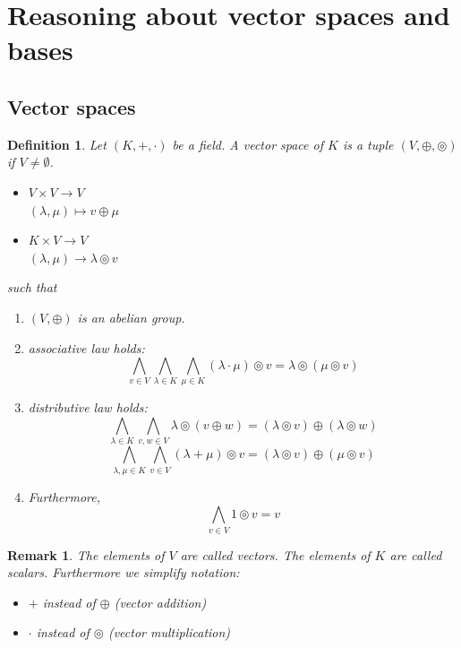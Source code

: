 \documentclass[a4paper,landscape,twocolumn]{article}
\newtheorem{defi}{Definition}[section]
\newtheorem{rem}{Remark}[section]
\begin{document}
\section{Reasoning about vector spaces and bases}
\subsection{Vector spaces}

\begin{defi}
  Let $(K, +, \cdot)$ be a field.
  A vector space of $K$ is a tuple $(V, \oplus, \circledcirc)$
  if $V \neq \emptyset$.
  \begin{itemize}
    \item
      $V \times V \rightarrow V$ \\
      $(\lambda, \mu) \mapsto v \oplus \mu$
    \item
      $K \times V \rightarrow V$ \\
      $(\lambda, \mu) \rightarrow \lambda \circledcirc v$
  \end{itemize}
  such that
  \begin{enumerate}
    \item $(V, \oplus)$ is an abelian group.
    \item associative law holds:
      \[
        \bigwedge_{v \in V} \bigwedge_{\lambda \in K} \bigwedge_{\mu \in K} (\lambda \cdot \mu) \circledcirc v
        = \lambda \circledcirc (\mu \circledcirc v)
      \]
    \item distributive law holds:
      \[
        \bigwedge_{\lambda \in K} \bigwedge_{v,w \in V} \lambda \circledcirc (v \oplus w) = (\lambda \circledcirc v) \oplus (\lambda \circledcirc w)
      \] \[
        \bigwedge_{\lambda, \mu \in K} \bigwedge_{v \in V} (\lambda + \mu) \circledcirc v = (\lambda \circledcirc v) \oplus (\mu \circledcirc v)
      \]
    \item Furthermore,
      \[ \bigwedge_{v \in V} 1 \circledcirc v = v \]
  \end{enumerate}
\end{defi}

\begin{rem}
  The elements of $V$ are called \emph{vectors}.
  The elements of $K$ are called \emph{scalars}.
  Furthermore we simplify notation:
  \begin{itemize}
    \item $+$ instead of $\oplus$ (vector addition)
    \item $\cdot$ instead of $\circledcirc$ (vector multiplication)
  \end{itemize}
\end{rem}
\end{document}
